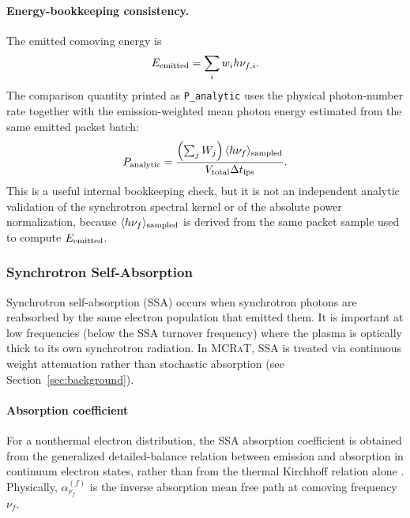 \documentclass[12pt,a4paper]{article}
\newcommand{\nuf}{\nu_{\!f}}
\newcommand{\code}[1]{\texttt{#1}}
\newcommand{\mcrat}{\textsc{MCRaT}}
\begin{document}
\paragraph{Energy-bookkeeping consistency.}
The emitted comoving energy is
\begin{equation}
	E_{\rm emitted}
	=
	\sum_i w_i h\nu_{f,i}.
\end{equation}
The comparison quantity printed as \code{P\_analytic} uses the physical
photon-number rate together with the emission-weighted mean photon energy
estimated from the same emitted packet batch:
\begin{equation}
	P_{\rm analytic}
	=
	\frac{
		\left(\sum_jW_j\right)
		\langle h\nu_f\rangle_{\rm sampled}
	}{
		V_{\rm total}\Delta t_{\rm fps}
	}.
\end{equation}
This is a useful internal bookkeeping check, but it is not an independent
analytic validation of the synchrotron spectral kernel or of the absolute
power normalization, because
\(\langle h\nu_f\rangle_{\rm sampled}\) is derived from the same packet
sample used to compute \(E_{\rm emitted}\).

\subsubsection{Synchrotron Self-Absorption}
\label{sec:ssa}

Synchrotron self-absorption (SSA) occurs when synchrotron photons are
reabsorbed by the same electron population that emitted them.  It is
important at low frequencies (below the SSA turnover frequency) where the
plasma is optically thick to its own synchrotron radiation.  In \mcrat{},
SSA is treated via continuous weight attenuation rather than stochastic
absorption (see Section~\ref{sec:background}).

\paragraph{Absorption coefficient}
\label{sec:alpha}

For a nonthermal electron distribution, the SSA absorption coefficient is
obtained from the generalized detailed-balance relation between emission
and absorption in continuum electron states, rather than from the thermal
Kirchhoff relation alone \citep{rybicki1979,kawashima2023}. Physically,
$\alpha_{\nuf}^{(f)}$ is the inverse absorption mean free path at comoving
frequency $\nuf$.
\end{document}
